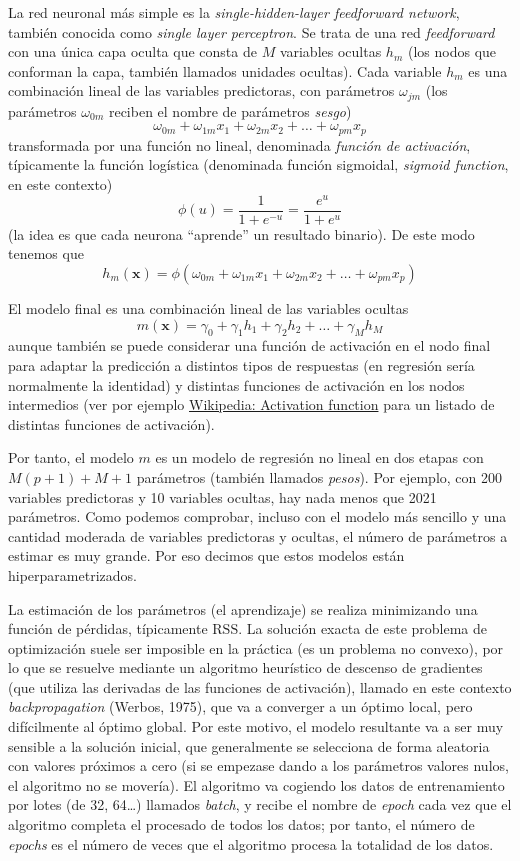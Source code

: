 \documentclass[
]{book}
\theoremstyle{break}
\theoremstyle{definition}
\theoremstyle{definition}
\theoremstyle{definition}
\theoremstyle{remark}
\begin{document}
La red neuronal más simple es la \emph{single-hidden-layer feedforward network}, también conocida como \emph{single layer perceptron}. Se trata de una red \emph{feedforward} con una única capa oculta que consta de \(M\) variables ocultas \(h_m\) (los nodos que conforman la capa, también llamados unidades ocultas). Cada variable \(h_m\) es una combinación lineal de las variables predictoras, con parámetros \(\omega_{jm}\) (los parámetros \(\omega_{0m}\) reciben el nombre de parámetros \emph{sesgo})
\[\omega_{0m} + \omega_{1m} x_1 + \omega_{2m} x_2 + \ldots + \omega_{pm} x_p\]
transformada por una función no lineal, denominada \emph{función de activación}, típicamente la función logística (denominada función sigmoidal, \emph{sigmoid function}, en este contexto)
\[\phi(u) = \frac{1}{1 + e^{-u}} = \frac{e^u}{1 + e^u}\]
(la idea es que cada neurona ``aprende'' un resultado binario).
De este modo tenemos que
\[h_{m}(\mathbf{x}) = \phi\left( \omega_{0m} + \omega_{1m} x_1 + \omega_{2m} x_2 + \ldots + \omega_{pm} x_p \right)\]

El modelo final es una combinación lineal de las variables ocultas
\[m(\mathbf{x}) = \gamma_0 + \gamma_1 h_1 + \gamma_2 h_2 + \ldots + \gamma_M h_M\]
aunque también se puede considerar una función de activación en el nodo final para adaptar la predicción a distintos tipos de respuestas (en regresión sería normalmente la identidad) y distintas funciones de activación en los nodos intermedios (ver por ejemplo \href{https://en.wikipedia.org/wiki/Activation_function}{Wikipedia: Activation function} para un listado de distintas funciones de activación).

Por tanto, el modelo \(m\) es un modelo de regresión no lineal en dos etapas con \(M(p + 1) + M + 1\) parámetros (también llamados \emph{pesos}). Por ejemplo, con 200 variables predictoras y 10 variables ocultas, hay nada menos que 2021 parámetros. Como podemos comprobar, incluso con el modelo más sencillo y una cantidad moderada de variables predictoras y ocultas, el número de parámetros a estimar es muy grande. Por eso decimos que estos modelos están hiperparametrizados.

La estimación de los parámetros (el aprendizaje) se realiza minimizando una función de pérdidas, típicamente \(\mbox{RSS}\). La solución exacta de este problema de optimización suele ser imposible en la práctica (es un problema no convexo), por lo que se resuelve mediante un algoritmo heurístico de descenso de gradientes (que utiliza las derivadas de las funciones de activación), llamado en este contexto \emph{backpropagation} (Werbos, 1975), que va a converger a un óptimo local, pero difícilmente al óptimo global. Por este motivo, el modelo resultante va a ser muy sensible a la solución inicial, que generalmente se selecciona de forma aleatoria con valores próximos a cero (si se empezase dando a los parámetros valores nulos, el algoritmo no se movería). El algoritmo va cogiendo los datos de entrenamiento por lotes (de 32, 64\ldots) llamados \emph{batch}, y recibe el nombre de \emph{epoch} cada vez que el algoritmo completa el procesado de todos los datos; por tanto, el número de \emph{epochs} es el número de veces que el algoritmo procesa la totalidad de los datos.
\end{document}
